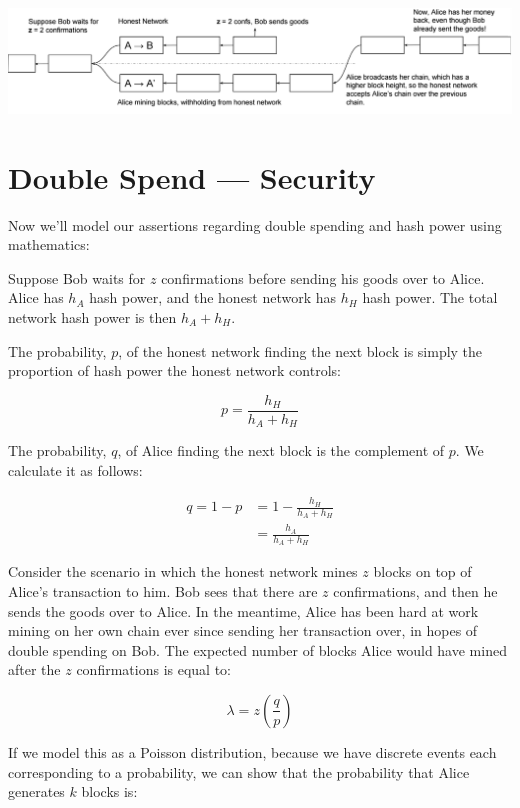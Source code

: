 \documentclass[11pt]{article}
\begin{document}
   \includegraphics[scale=0.3]{z_confirmation} \\
   
   \section*{Double Spend --- Security}
   
   Now we'll model our assertions regarding double spending and hash power using mathematics:
   
   Suppose Bob waits for $z$ confirmations before sending his goods over to Alice. Alice has $h_A$ hash power, and the honest network has $h_H$ hash power. The total network hash power is then $h_A + h_H$. 
   
   The probability, $p$, of the honest network finding the next block is simply the proportion of hash power the honest network controls:
   
   $$p = \frac{h_H}{h_A + h_H} $$
   
   The probability, $q$, of Alice finding the next block is the complement of $p$. We calculate it as follows:
   
   \begin{equation*}
       \begin{split*}
           q = 1-p &= 1 - \frac{h_H}{h_A + h_H} \\
           &= \frac{h_A}{h_A + h_H}
       \end{split*}
   \end{equation*}
   
   Consider the scenario in which the honest network mines $z$ blocks on top of Alice's transaction to him. Bob sees that there are $z$ confirmations, and then he sends the goods over to Alice. In the meantime, Alice has been hard at work mining on her own chain ever since sending her transaction over, in hopes of double spending on Bob. The expected number of blocks Alice would have mined after the $z$ confirmations is equal to:
   
   $$\lambda = z(\frac{q}{p})$$
   
   If we model this as a Poisson distribution, because we have discrete events each corresponding to a probability, we can show that the probability that Alice generates $k$ blocks is:
   
\end{document}

